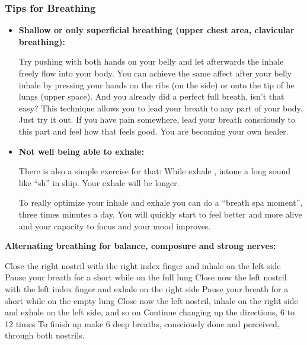 \documentclass[../main.tex]{subfiles}
\begin{document}
{    \subsubsection{Tips for Breathing}

    \begin{itemize}
    \item \textbf{Shallow or only superficial breathing (upper chest area, clavicular breathing):}

      Try pushing with both hands on your belly and let afterwards the inhale freely flow into your body.
      You can achieve the same affect after your belly inhale by pressing your hands on the ribs (on the side)
      or onto the tip of he lungs (upper space).
      And you already did a perfect full breath, isn't that easy?
      This technique allows you to lead your breath to any part of your body. Just try it out.
      If you have pain somewhere, lead your
      breath consciously to this part and feel how that feels good.
      You are becoming your own healer.

    \item \textbf{Not well being able to exhale:}

      There is also a simple exercise for that: While exhale , intone a long sound like ``sh'' in ship.
      Your exhale will be longer.

      To really optimize your inhale and exhale you can do a ``breath spa moment'', three times minutes a day.
      You will quickly start to feel better and more alive and your capacity to focus and your mood improves.
    \end{itemize}
    

\noindent \textbf{Alternating breathing for balance, composure and strong nerves:}

\noindent    Close the right nostril with the  right index finger and inhale on the left side \newline
    Pause your breath for a short while on the full lung \newline
    Close now the left nostril with the left index finger and exhale on the right side \newline
    Pause your breath for a short while on the empty lung \newline    
    Close now the left nostril, inhale on the right side and exhale on the left side, and so on \newline
    Continue changing up the directions, 6 to 12 times \newline
    To finish up make 6 deep breaths, consciously done and perceived, through both nostrils.

}
\end{document}
